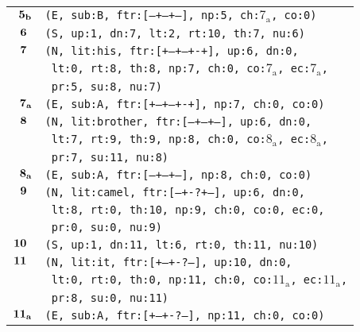 \documentclass{article}
\begin{document}
\begin{minipage}{\textwidth}
{\begin{tabular}{|r|l|}
    ${\textbf{\textrm{5}}_{\textbf{\textrm{b}}}}$ & \texttt{\texttt{(E,~sub:B,~ftr:[---+--+--],~np:5,~ch:${\textrm{7}_{\textrm{a}}}$,~co:0)}} \\
    ${\textbf{\textrm{6}}_{\phantom{z}}}$ & \texttt{\texttt{(S,~up:1,~dn:7,~lt:2,~rt:10,~th:7,~nu:6)}} \\
    ${\textbf{\textrm{7}}_{\phantom{z}}}$ & \texttt{\texttt{(N,~lit:his,~ftr:[+--+--+-+],~up:6,~dn:0,}} \\
    & \texttt{\texttt{~lt:0,~rt:8,~th:8,~np:7,~ch:0,~co:${\textrm{7}_{\textrm{a}}}$,~ec:${\textrm{7}_{\textrm{a}}}$,}} \\
    & \texttt{\texttt{~pr:5,~su:8,~nu:7)}} \\
    ${\textbf{\textrm{7}}_{\textbf{\textrm{a}}}}$ & \texttt{\texttt{(E,~sub:A,~ftr:[+--+--+-+],~np:7,~ch:0,~co:0)}} \\
    ${\textbf{\textrm{8}}_{\phantom{z}}}$ & \texttt{\texttt{(N,~lit:brother,~ftr:[---+--+--],~up:6,~dn:0,}} \\
    & \texttt{\texttt{~lt:7,~rt:9,~th:9,~np:8,~ch:0,~co:${\textrm{8}_{\textrm{a}}}$,~ec:${\textrm{8}_{\textrm{a}}}$,}} \\
    & \texttt{\texttt{~pr:7,~su:11,~nu:8)}} \\
    ${\textbf{\textrm{8}}_{\textbf{\textrm{a}}}}$ & \texttt{\texttt{(E,~sub:A,~ftr:[---+--+--],~np:8,~ch:0,~co:0)}} \\
    ${\textbf{\textrm{9}}_{\phantom{z}}}$ & \texttt{\texttt{(N,~lit:camel,~ftr:[---+-?+--],~up:6,~dn:0,}} \\
    & \texttt{\texttt{~lt:8,~rt:0,~th:10,~np:9,~ch:0,~co:0,~ec:0,}} \\
    & \texttt{\texttt{~pr:0,~su:0,~nu:9)}} \\
    ${\textbf{\textrm{10}}_{\phantom{z}}}$ & \texttt{\texttt{(S,~up:1,~dn:11,~lt:6,~rt:0,~th:11,~nu:10)}} \\
    ${\textbf{\textrm{11}}_{\phantom{z}}}$ & \texttt{\texttt{(N,~lit:it,~ftr:[+--+-?---],~up:10,~dn:0,}} \\
    & \texttt{\texttt{~lt:0,~rt:0,~th:0,~np:11,~ch:0,~co:${\textrm{11}_{\textrm{a}}}$,~ec:${\textrm{11}_{\textrm{a}}}$,}} \\
    & \texttt{\texttt{~pr:8,~su:0,~nu:11)}} \\
    ${\textbf{\textrm{11}}_{\textbf{\textrm{a}}}}$ & \texttt{\texttt{(E,~sub:A,~ftr:[+--+-?---],~np:11,~ch:0,~co:0)}} \\
    \hline
  \end{tabular}
  }
\end{minipage}
\bigbreak
\end{document}
